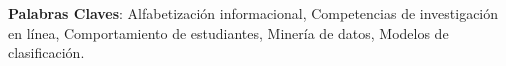 \par\noindent
{\bfseries Palabras Claves\/}: Alfabetización informacional, Competencias de investigación en línea, Comportamiento de estudiantes, Minería de datos, Modelos de clasificación.





